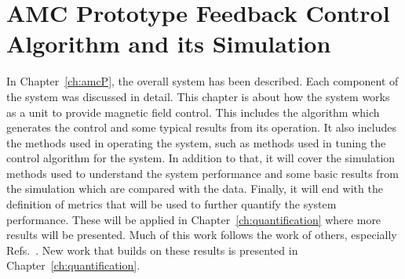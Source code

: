 
\chapter{AMC Prototype Feedback Control Algorithm and its Simulation}\label{ch:operation}







In Chapter~\ref{ch:amcP}, the overall system has been described.  Each component of the system was discussed in detail. This chapter is about how the system works as a unit to provide magnetic field control.  This includes the algorithm which generates the control and some typical results from its operation.  It also includes the methods used in operating the system, such as methods used in tuning the control algorithm for the system. In addition to that, it will cover the simulation methods used to understand the system performance and some basic results from the simulation which are compared with the data. Finally, it will end with the definition of metrics that will be used to further quantify the system performance.  These will be applied in Chapter~\ref{ch:quantification} where more results will be presented. Much of this work follows the work of others, especially Refs.~\cite{bea,rawlik,lins}.  New work that builds on these results is presented in Chapter~\ref{ch:quantification}.

